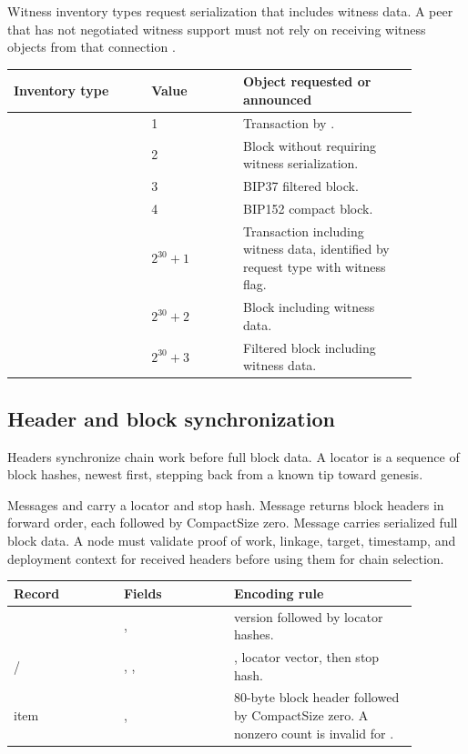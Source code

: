 Witness inventory types request serialization that includes witness data. A
peer that has not negotiated witness support must not rely on receiving witness
objects from that connection \cite{bip-0144}.

\begin{longtable}{@{}L{0.30\linewidth}L{0.20\linewidth}L{0.38\linewidth}@{}}
\toprule
Inventory type & Value & Object requested or announced \\
\midrule
{} & 1 & Transaction by . \\
 & 2 & Block without requiring witness serialization. \\
 & 3 & BIP37 filtered block. \\
 & 4 & BIP152 compact block. \\
 & $2^{30} + 1$ & Transaction including witness data, identified by  request type with witness flag. \\
 & $2^{30} + 2$ & Block including witness data. \\
{\small{}\newline{}} & $2^{30} + 3$ & Filtered block including witness data. \\
\bottomrule
\end{longtable}

\subsection{Header and block synchronization}

Headers synchronize chain work before full block data. A locator is a sequence
of block hashes, newest first, stepping back from a known tip toward genesis.

Messages  and  carry a locator and stop hash.
Message  returns block headers in forward order, each followed by
CompactSize zero. Message  carries serialized full block data. A
node must validate proof of work, linkage, target, timestamp, and deployment
context for received headers before using them for chain selection.

\begin{longtable}{@{}L{0.24\linewidth}L{0.24\linewidth}L{0.40\linewidth}@{}}
\toprule
Record & Fields & Encoding rule \\
\midrule
{} & ,  &  version followed by  locator hashes. \\
{\small{}/\newline{}} & , ,  & , locator vector, then  stop hash. \\
 item & ,  & 80-byte block header followed by CompactSize zero. A nonzero count is invalid for . \\
\bottomrule
\end{longtable}

